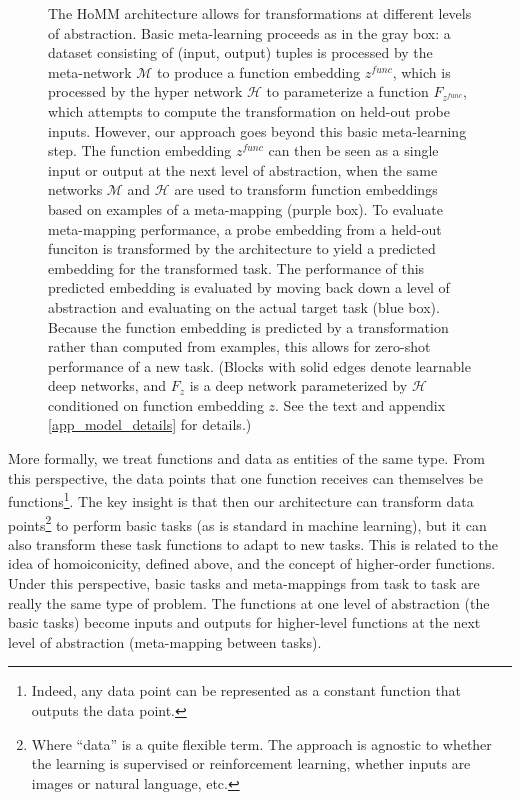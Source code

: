 \documentclass{article}
\begin{document}
\begin{figure}
\caption{The HoMM architecture allows for transformations at different levels of abstraction. Basic meta-learning proceeds as in the gray box: a dataset consisting of (input, output) tuples is processed by the meta-network \(\mathcal{M}\) to produce a function embedding \(z^{func}\), which is processed by the hyper network \(\mathcal{H}\) to parameterize a function \(F_{z^{func}}\), which attempts to compute the transformation on held-out probe inputs. However, our approach goes beyond this basic meta-learning step. The function embedding \(z^{func}\) can then be seen as a single input or output at the next level of abstraction, when the same networks \(\mathcal{M}\) and \(\mathcal{H}\) are used to transform function embeddings based on examples of a meta-mapping (purple box). To evaluate meta-mapping performance, a probe embedding from a held-out funciton is transformed by the architecture to yield a predicted embedding for the transformed task. The performance of this predicted embedding is evaluated by moving back down a level of abstraction and evaluating on the actual target task (blue box). Because the function embedding is predicted by a transformation rather than computed from examples, this allows for zero-shot performance of a new task. (Blocks with solid edges denote learnable deep networks, and $F_{z}$ is a deep network parameterized by $\mathcal{H}$ conditioned on function embedding \(z\). See the text and appendix \ref{app_model_details} for details.)} \label{architecture_inference_fig}
\end{figure}
More formally, we treat functions and data as entities of the same type. From this perspective, the data points that one function receives can themselves be functions\footnote{Indeed, any data point can be represented as a constant function that outputs the data point.}. The key insight is that then our architecture can transform data points\footnote{Where ``data'' is a quite flexible term. The approach is agnostic to whether the learning is supervised or reinforcement learning, whether inputs are images or natural language, etc.} to perform basic tasks (as is standard in machine learning), but it can also transform these task functions to adapt to new tasks. This is related to the idea of homoiconicity, defined above, and the concept of higher-order functions. Under this perspective, basic tasks and meta-mappings from task to task are really the same type of problem. The functions at one level of abstraction (the basic tasks) become inputs and outputs for higher-level functions at the next level of abstraction (meta-mapping between tasks). \par
\end{document}
